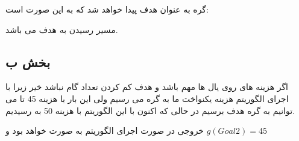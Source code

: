 \documentclass[paper=a4, fontsize=11pt]{article}
\begin{document}
گره  به عنوان هدف پیدا خواهد شد که به این صورت است:


مسیر رسیدن به هدف
می باشد.
\subsection{بخش ب}
اگر هزینه های روی یال ها مهم باشد و هدف کم کردن تعداد گام نباشد خیر زیرا با اجرای الگوریتم هزینه یکنواخت ما به گره  می رسیم ولی این بار با هزینه 45 تا می توانیم به گره هدف برسیم در حالی که اکنون با این الگوریتم با هزینه 50 به  رسیدیم.

خروجی در صورت اجرای الگوریتم  به صورت 
خواهد بود و 
$ g(Goal2) = 45 $
\end{document}

